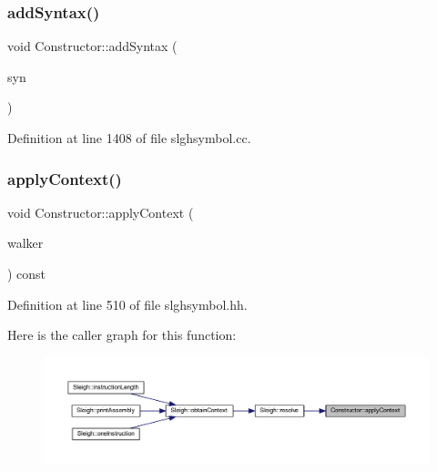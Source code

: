 \subsubsection{\texorpdfstring{addSyntax()}{addSyntax()}}
{\footnotesize\ttfamily void Constructor\+::add\+Syntax (\begin{DoxyParamCaption}\item[{const string \&}]{syn }\end{DoxyParamCaption})}



Definition at line 1408 of file slghsymbol.\+cc.

\mbox{\label{class_constructor_ae5e916cdee72c2ecd8a4b1f52d61331a}} 
\subsubsection{\texorpdfstring{applyContext()}{applyContext()}}
{\footnotesize\ttfamily void Constructor\+::apply\+Context (\begin{DoxyParamCaption}\item[{\mbox{\hyperlink{class_parser_walker_change}{Parser\+Walker\+Change}} \&}]{walker }\end{DoxyParamCaption}) const\hspace{0.3cm}{\ttfamily [inline]}}



Definition at line 510 of file slghsymbol.\+hh.

Here is the caller graph for this function\+:
\nopagebreak
\begin{figure}[H]
\begin{center}
\leavevmode
\includegraphics[width=350pt]{class_constructor_ae5e916cdee72c2ecd8a4b1f52d61331a_icgraph}
\end{center}
\end{figure}
\mbox{\label{class_constructor_a9c900244b8b33d73688c077a0f360812}} 
